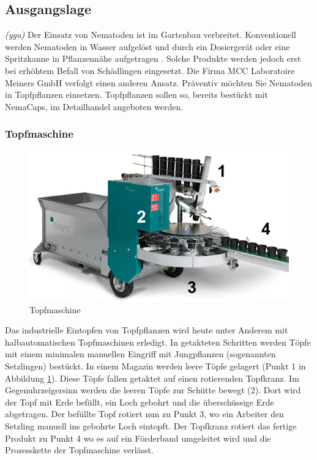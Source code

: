 
\subsection{Ausgangslage}
\textit{(ygu)} Der Einsatz von Nematoden ist im Gartenbau verbreitet. Konventionell werden Nematoden in Wasser aufgelöst und durch ein Dosiergerät oder eine Spritzkanne in Pflanzennähe aufgetragen \cite{birchmeier}. Solche Produkte werden jedoch erst bei erhöhtem Befall von Schädlingen eingesetzt. Die Firma MCC Laboratoire Meiners GmbH verfolgt einen anderen Ansatz. Präventiv möchten Sie Nematoden in Topfpflanzen einsetzen. Topfpflanzen sollen so, bereits bestückt mit NemaCaps, im Detailhandel angeboten werden. 
\subsubsection{Topfmaschine}
\begin{figure}
	\includegraphics[scale=0.5]{Illustrationen/3-Einleitung/schema_topfmaschine.jpg}
	\caption{Topfmaschine \protect\cite{mayer}}
	\label{fig:schema_topfmaschine}
\end{figure}
Das industrielle Eintopfen von Topfpflanzen wird heute unter Anderem mit halbautomatischen Topfmaschinen erledigt. In getakteten Schritten werden Töpfe mit einem minimalen manuellen Eingriff mit Jungpflanzen (sogenannten Setzlingen) bestückt. In einem Magazin werden leere Töpfe gelagert (Punkt 1 in Abbildung \ref{fig:schema_topfmaschine}). Diese Töpfe fallen getaktet auf einen rotierenden Topfkranz. Im Gegenuhrzeigersinn werden die leeren Töpfe zur Schütte bewegt (2). Dort wird der Topf mit Erde befüllt, ein Loch gebohrt und die überschüssige Erde abgetragen. Der befüllte Topf rotiert nun zu Punkt 3, wo ein Arbeiter den Setzling manuell ins gebohrte Loch eintopft. Der Topfkranz rotiert das fertige Produkt zu Punkt 4 wo es auf ein Förderband umgeleitet wird und die Prozesskette der Topfmaschine verlässt.

